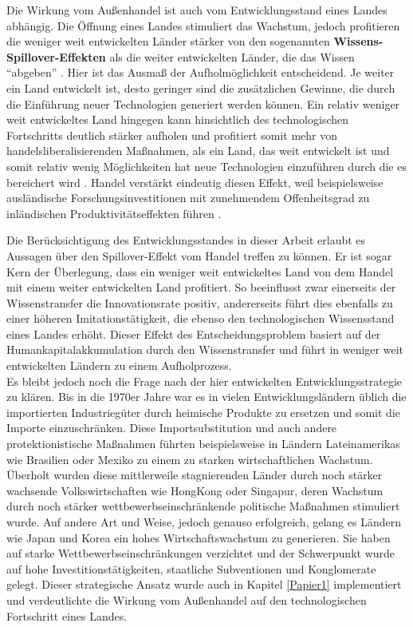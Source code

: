 Die Wirkung vom Au{\ss}enhandel ist auch vom Entwicklungsstand eines Landes abh{\"a}ngig. Die {\"O}ffnung eines Landes stimuliert das Wachstum, jedoch profitieren die weniger weit entwickelten L{\"a}nder st{\"a}rker von den sogenannten \textbf{Wissens-Spillover-Effekten} als die weiter entwickelten L{\"a}nder, die das Wissen "`abgeben"' \citep{Sachs.1995,Grossman.1990b}. Hier ist das Ausma{\ss} der Aufholm{\"o}glichkeit entscheidend. Je weiter ein Land entwickelt ist, desto geringer sind die zus{\"a}tzlichen Gewinne, die durch die Einf{\"u}hrung neuer Technologien generiert werden k{\"o}nnen. Ein relativ weniger weit entwickeltes Land hingegen kann hinsichtlich des technologischen Fortschritts deutlich st{\"a}rker aufholen und profitiert somit mehr von handelsliberalisierenden Ma{\ss}nahmen, als  ein Land, das weit entwickelt ist und somit relativ wenig M{\"o}glichkeiten hat neue Technologien einzuf{\"u}hren durch die es bereichert wird \citep{Keller.2004}. Handel verst{\"a}rkt eindeutig diesen Effekt, weil beispielsweise ausl{\"a}ndische Forschungsinvestitionen mit zunehmendem Offenheitsgrad zu inl{\"a}ndischen Produktivit{\"a}tseffekten f{\"u}hren \citep{Coe.1995}.\newline 


Die Ber{\"u}cksichtigung des Entwicklungsstandes in dieser Arbeit erlaubt es Aussagen {\"u}ber den Spillover-Effekt vom Handel treffen zu k{\"o}nnen. Er ist sogar Kern der {\"U}berlegung, dass ein weniger weit entwickeltes Land von dem Handel mit einem weiter entwickelten Land profitiert. So beeinflusst zwar einerseits der Wissenstransfer die Innovationsrate positiv, andererseits f{\"u}hrt dies ebenfalls zu einer h{\"o}heren Imitationst{\"a}tigkeit, die ebenso den technologischen Wissensstand eines Landes erh{\"o}ht. Dieser Effekt des Entscheidungsproblem basiert auf der Humankapitalakkumulation durch den Wissenstransfer und f{\"u}hrt in weniger weit entwickelten L{\"a}ndern zu einem Aufholprozess.\\


Es bleibt jedoch noch die Frage nach der hier entwickelten Entwicklungsstrategie zu kl{\"a}ren. Bis in die 1970er Jahre war es in vielen Entwicklungsl{\"a}ndern {\"u}blich die importierten Industrieg{\"u}ter durch heimische Produkte zu ersetzen und somit die Importe einzuschr{\"a}nken. Diese Importsubstitution und auch andere protektionistische Ma{\ss}nahmen f{\"u}hrten beispielsweise in L{\"a}ndern Lateinamerikas wie Brasilien oder Mexiko zu einem zu starken wirtschaftlichen  Wachstum. {\"U}berholt wurden diese mittlerweile stagnierenden L{\"a}nder durch noch st{\"a}rker wachsende Volkswirtschaften wie HongKong oder Singapur, deren Wachstum durch noch st{\"a}rker wettbewerbseinschr{\"a}nkende politische Ma{\ss}nahmen stimuliert wurde. Auf andere Art und Weise, jedoch genauso erfolgreich, gelang es L{\"a}ndern wie Japan und Korea ein hohes Wirtschaftswachstum zu generieren. Sie haben auf starke Wettbewerbseinschr{\"a}nkungen verzichtet und der Schwerpunkt wurde auf hohe Investitionst{\"a}tigkeiten, staatliche Subventionen und Konglomerate gelegt. Dieser strategische Ansatz wurde auch in Kapitel \ref{Papier1} implementiert und verdeutlichte die Wirkung vom Au{\ss}enhandel auf den technologischen Fortschritt eines Landes.\newline


